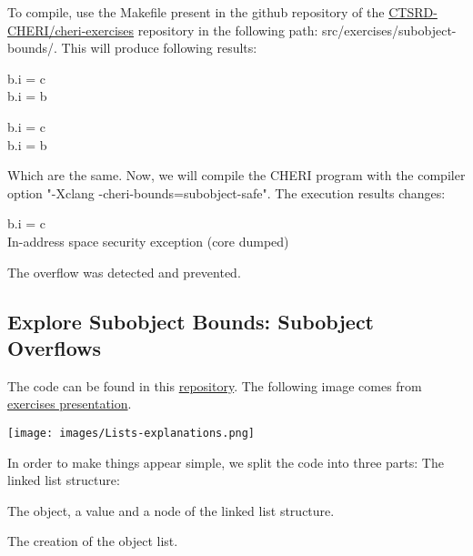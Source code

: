 \documentclass[a4paper, 11pt]{article}
\begin{document}
	To compile, use the Makefile present in the github repository of the \href{https://github.com/CTSRD-CHERI/cheri-exercises}{CTSRD-CHERI/cheri-exercises} repository in the following path: src/exercises/subobject-bounds/. 
	This will produce following results:
	\begin{tcolorbox}[colback=gray!5!white, colframe=gray!75!black, title=Output on a classic \Gls{risc-v} environment (no CHERI Protection)]
	b.i = c\\
	b.i = b
	\end{tcolorbox}
	\begin{tcolorbox}[colback=gray!5!white, colframe=blue!75!black, title=Output On an environment protected by CHERI]
		b.i = c\\
		b.i = b
	\end{tcolorbox}
	Which are the same. Now, we will compile the CHERI program with the compiler option "-Xclang -cheri-bounds=subobject-safe".
	The execution results changes:
	\begin{tcolorbox}[colback=gray!5!white, colframe=blue!75!black, title=Output On an environment protected by CHERI \& Subobject Protection]
		b.i = c\\
		In-address space security exception (core dumped)
	\end{tcolorbox}
	The overflow was detected and prevented.
	


\subsection{Explore Subobject Bounds: Subobject Overflows}

The code can be found in this \href{https://ctsrd-cheri.github.io/cheri-exercises/exercises/subobject-bounds/}{repository}.
The following image comes from \href{https://ctsrd-cheri.github.io/cheri-exercises/exercises/subobject-bounds/subobject-bounds.pptx}{exercises presentation}.

\begin{minipage}{\linewidth}
	\texttt{[image: images/Lists-explanations.png]}
\end{minipage}
In order to make things appear simple, we split the code into three parts:
The linked list structure:

The object, a value and a node of the linked list structure.

The creation of the object list.

\end{document}
